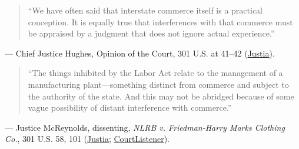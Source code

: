 \documentclass[12pt]{article}
\begin{document}
\begin{quote}
``We have often said that interstate commerce itself is a practical conception. It is equally true that interferences with that commerce must be appraised by a judgment that does not ignore actual experience.''
\end{quote}
\noindent --- Chief Justice Hughes, Opinion of the Court, 301 U.S. at 41--42 (\href{https://supreme.justia.com/cases/federal/us/301/1/}{Justia}).

\begin{quote}
``The things inhibited by the Labor Act relate to the management of a manufacturing plant---something distinct from commerce and subject to the authority of the state. And this may not be abridged because of some vague possibility of distant interference with commerce.''
\end{quote}
\noindent --- Justice McReynolds, dissenting, \textit{NLRB v. Friedman-Harry Marks Clothing Co.}, 301 U.S. 58, 101 (\href{https://supreme.justia.com/cases/federal/us/301/58/}{Justia}; \href{https://www.courtlistener.com/opinion/102804/national-labor-relations-board-v-jones-laughlin-steel-corp/}{CourtListener}).
\end{document}
